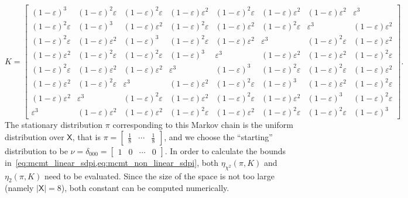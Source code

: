 \documentclass[conference,letterpaper]{IEEEtran}
\def \X{\mathsf X}
\begin{document}
    \begin{equation*}
    K = \begin{bmatrix} 
        (1-\varepsilon)^3 & (1-\varepsilon)^2\varepsilon & (1-\varepsilon)^2\varepsilon & (1-\varepsilon)\varepsilon^2 & (1-\varepsilon)^2\varepsilon & (1-\varepsilon)\varepsilon^2 & (1-\varepsilon)\varepsilon^2 & \varepsilon^3 \\
        (1-\varepsilon)^2\varepsilon & (1-\varepsilon)^3 & (1-\varepsilon)\varepsilon^2 & (1-\varepsilon)^2\varepsilon & (1-\varepsilon)\varepsilon^2 & (1-\varepsilon)^2\varepsilon & \varepsilon^3 & (1-\varepsilon)\varepsilon^2 \\
        (1-\varepsilon)^2\varepsilon & (1-\varepsilon)\varepsilon^2 & (1-\varepsilon)^3 & (1-\varepsilon)^2\varepsilon & (1-\varepsilon)\varepsilon^2 & \varepsilon^3 & (1-\varepsilon)^2\varepsilon & (1-\varepsilon)\varepsilon^2 \\
        (1-\varepsilon)\varepsilon^2 & (1-\varepsilon)^2\varepsilon & (1-\varepsilon)^2\varepsilon & (1-\varepsilon)^3 & \varepsilon^3 & (1-\varepsilon)\varepsilon^2 & (1-\varepsilon)\varepsilon^2 & (1-\varepsilon)^2\varepsilon \\
        (1-\varepsilon)^2\varepsilon & (1-\varepsilon)\varepsilon^2 & (1-\varepsilon)\varepsilon^2 & \varepsilon^3 & (1-\varepsilon)^3 & (1-\varepsilon)^2\varepsilon & (1-\varepsilon)^2\varepsilon & (1-\varepsilon)\varepsilon^2 \\
        (1-\varepsilon)\varepsilon^2 & (1-\varepsilon)^2\varepsilon & \varepsilon^3 & (1-\varepsilon)\varepsilon^2 & (1-\varepsilon)^2\varepsilon & (1-\varepsilon)^3 & (1-\varepsilon)\varepsilon^2 & (1-\varepsilon)^2\varepsilon \\
        (1-\varepsilon)\varepsilon^2 & \varepsilon^3 & (1-\varepsilon)^2\varepsilon & (1-\varepsilon)\varepsilon^2 & (1-\varepsilon)^2\varepsilon & (1-\varepsilon)\varepsilon^2 & (1-\varepsilon)^3 & (1-\varepsilon)^2\varepsilon \\
        \varepsilon^3 & (1-\varepsilon)\varepsilon^2 & (1-\varepsilon)\varepsilon^2 & (1-\varepsilon)^2\varepsilon & (1-\varepsilon)\varepsilon^2 & (1-\varepsilon)^2\varepsilon & (1-\varepsilon)^2\varepsilon & (1-\varepsilon)^3 
        \end{bmatrix}.
    \end{equation*}
    The stationary distribution $\pi$ corresponding to this Markov chain is the uniform distribution over $\X$, that is $\pi=\begin{bmatrix}
        \frac18 &\cdots&\frac18
    \end{bmatrix}$, and we choose the ``starting'' distribution to be $\nu=\delta_{000}=\begin{bmatrix}
        1 & 0&\cdots&0
    \end{bmatrix}$. In order to calculate the bounds in~\cref{eq:mcmt_linear_sdpi,eq:mcmt_non_linear_sdpi}, both $\eta_{\chi^2}(\pi, K)$ and $\eta_2(\pi, K)$ need to be evaluated. Since the size of the space is not too large (namely $|\X|=8$), both constant can be computed numerically.
\end{document}
